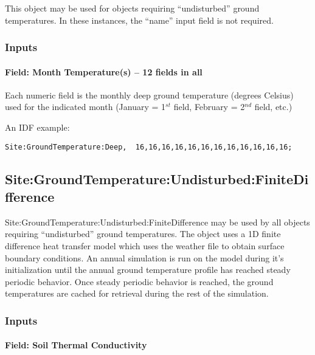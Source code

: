 This object may be used for objects requiring ``undisturbed'' ground temperatures. In these instances, the ``name'' input field is not required.

\subsubsection{Inputs}\label{inputs-13-007}

\paragraph{Field: Month Temperature(s) -- 12 fields in all}\label{field-month-temperatures-12-fields-in-all-2}

Each numeric field is the monthly deep ground temperature (degrees Celsius) used for the indicated month (January = 1\(^{st}\) field, February = 2\(^{nd}\) field, etc.)

An IDF example:

\begin{lstlisting}
Site:GroundTemperature:Deep,  16,16,16,16,16,16,16,16,16,16,16,16;
\end{lstlisting}

\subsection{Site:GroundTemperature:Undisturbed:FiniteDifference}\label{sitegroundtemperatureundisturbedfinitedifference}

Site:GroundTemperature:Undisturbed:FiniteDifference may be used by all objects requiring ``undisturbed'' ground temperatures. The object uses a 1D finite difference heat transfer model which uses the weather file to obtain surface boundary conditions. An annual simulation is run on the model during it's initialization until the annual ground temperature profile has reached steady periodic behavior. Once steady periodic behavior is reached, the ground temperatures are cached for retrieval during the rest of the simulation.

\subsubsection{Inputs}\label{inputs-14-007}

\paragraph{Field: Soil Thermal Conductivity}\label{field-soil-thermal-conductivity-000}

